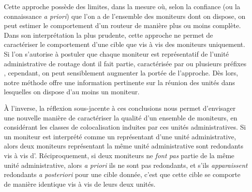 Cette approche possède des limites, dans la mesure où, selon la confiance (ou la
connaissance {\em a priori}) que l'on a de l'ensemble des moniteurs dont on
dispose, on peut estimer le comportement d'un routeur de manière plus ou moins
complète. Dans son interprétation la plus prudente, cette approche ne permet de
caractériser le comportement d'une cible que vis à vis des moniteurs uniquement.
Si l'on s'autorise à postuler que chaque moniteur est représentatif de l'unité
administrative de routage dont il fait partie, caractérisée par ou plusieurs
préfixes \cidr, cependant, on peut sensiblement augmenter la portée de
l'approche.
Dès lors, notre méthode offre une information pertinente sur la réunion des
unités dans lesquelles on dispose d'au moins un moniteur.

À l'inverse, la réflexion sous-jacente à ces conclusions nous permet d'envisager
une nouvelle manière de caractériser la qualité d'un ensemble de moniteurs, en
considérant les classes de colocalisation induites par ces unités
administratives. Si un moniteur est interprété comme un représentant d'une
unité administrative, alors deux moniteurs représentant la même unité
administrative sont redondants vis à vis d'\udpping. Réciproquement, si deux
moniteurs ne {\em font pas} partie de la même unité administrative, alors {\em
a priori} ils ne sont pas redondants, et s'ils {\em apparaissent} redondants
{\em a posteriori} pour une cible donnée, c'est que cette cible se comporte de
manière identique vis à vis de leurs deux unités.